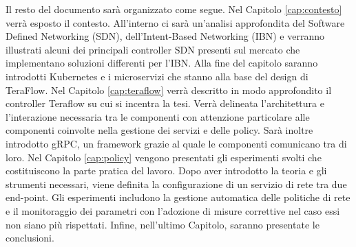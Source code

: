 \newline Il resto del documento sarà organizzato come segue.
\newline Nel Capitolo \ref{cap:contesto} verrà esposto il contesto. All'interno ci sarà un'analisi approfondita del Software Defined Networking (SDN), dell'Intent-Based Networking (IBN)
e verranno illustrati alcuni dei principali controller SDN presenti sul mercato che implementano soluzioni differenti per l'IBN. Alla fine del capitolo saranno introdotti Kubernetes e i microservizi che stanno alla base del design di TeraFlow.
\newline Nel Capitolo \ref{cap:teraflow} verrà descritto in modo approfondito il controller Teraflow su cui si incentra la tesi.
Verrà delineata l'architettura e l'interazione necessaria tra le componenti con attenzione particolare alle componenti coinvolte nella gestione dei servizi e delle policy.
Sarà inoltre introdotto gRPC, un framework grazie al quale le componenti comunicano tra di loro.
\newline Nel Capitolo \ref{cap:policy} vengono presentati gli esperimenti svolti che costituiscono la parte pratica del lavoro.
Dopo aver introdotto la teoria e gli strumenti necessari, viene definita la configurazione di un servizio di rete tra due end-point. Gli esperimenti includono la gestione
automatica delle politiche di rete e il monitoraggio dei parametri con l'adozione di misure correttive nel caso essi non siano più rispettati.
\newline Infine, nell'ultimo Capitolo, saranno presentate le conclusioni.

